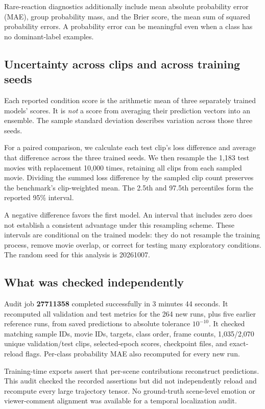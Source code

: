 \documentclass[11pt,a4paper]{article}
\begin{document}
Rare-reaction diagnostics additionally include mean absolute probability error (MAE), group probability mass, and the Brier score, the mean sum of squared probability errors. A probability error can be meaningful even when a class has no dominant-label examples.

\subsection{Uncertainty across clips and across training seeds}
Each reported condition score is the arithmetic mean of three separately trained models' scores. It is \emph{not} a score from averaging their prediction vectors into an ensemble. The sample standard deviation describes variation across those three seeds.

For a paired comparison, we calculate each test clip's loss difference and average that difference across the three trained seeds. We then resample the 1,183 test movies with replacement 10,000 times, retaining all clips from each sampled movie. Dividing the summed loss difference by the sampled clip count preserves the benchmark's clip-weighted mean. The 2.5th and 97.5th percentiles form the reported 95\% interval.

A negative difference favors the first model. An interval that includes zero does not establish a consistent advantage under this resampling scheme. These intervals are conditional on the trained models: they do not resample the training process, remove movie overlap, or correct for testing many exploratory conditions. The random seed for this analysis is 20261007.

\subsection{What was checked independently}
Audit job \textbf{27711358} completed successfully in 3 minutes 44 seconds. It recomputed all validation and test metrics for the 264 new runs, plus five earlier reference runs, from saved predictions to absolute tolerance $10^{-10}$. It checked matching sample IDs, movie IDs, targets, class order, frame counts, 1,035/2,070 unique validation/test clips, selected-epoch scores, checkpoint files, and exact-reload flags. Per-class probability MAE also recomputed for every new run.

Training-time exports assert that per-scene contributions reconstruct predictions. This audit checked the recorded assertions but did not independently reload and recompute every large trajectory tensor. No ground-truth scene-level emotion or viewer-comment alignment was available for a temporal localization audit.
\end{document}
